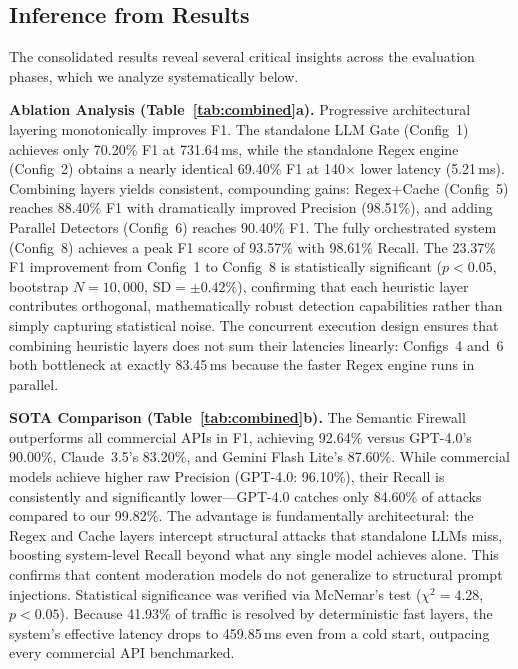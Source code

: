\documentclass[conference]{IEEEtran}
\begin{document}
\subsection{Inference from Results}

The consolidated results reveal several critical insights across
the evaluation phases, which we analyze systematically below.

\textbf{Ablation Analysis (Table~\ref{tab:combined}a).}
Progressive architectural layering monotonically improves F1. The
standalone LLM Gate (Config~1) achieves only 70.20\% F1 at
731.64\,ms, while the standalone Regex engine (Config~2) obtains a
nearly identical 69.40\% F1 at 140$\times$ lower latency (5.21\,ms).
Combining layers yields consistent, compounding gains: Regex+Cache
(Config~5) reaches 88.40\% F1 with dramatically improved Precision
(98.51\%), and adding Parallel Detectors (Config~6) reaches 90.40\%
F1. The fully orchestrated system (Config~8) achieves a peak F1 score of 93.57\% with
98.61\% Recall. The 23.37\% F1 improvement from Config~1 to Config~8
is statistically significant ($p < 0.05$, bootstrap $N{=}10{,}000$,
$\text{SD}=\pm 0.42\%$), confirming that each heuristic layer
contributes orthogonal, mathematically robust detection capabilities
rather than simply capturing statistical noise. The concurrent
execution design ensures that combining heuristic layers does not
sum their latencies linearly: Configs~4 and~6 both bottleneck at
exactly 83.45\,ms because the faster Regex engine runs in parallel.

\textbf{SOTA Comparison (Table~\ref{tab:combined}b).} The Semantic
Firewall outperforms all commercial APIs in F1, achieving 92.64\%
versus GPT-4.0's 90.00\%, Claude~3.5's 83.20\%, and Gemini
Flash Lite's 87.60\%. While commercial models achieve higher raw
Precision (GPT-4.0: 96.10\%), their Recall is consistently and
significantly lower---GPT-4.0 catches only 84.60\% of attacks
compared to our 99.82\%. The advantage is fundamentally
architectural: the Regex and Cache layers intercept structural
attacks that standalone LLMs miss, boosting system-level Recall
beyond what any single model achieves alone. This confirms that content moderation models do not generalize to
structural prompt injections. Statistical significance was verified
via McNemar's test ($\chi^2{=}4.28$, $p < 0.05$). Because 41.93\%
of traffic is resolved by deterministic fast layers, the system's
effective latency drops to 459.85\,ms even from a cold start,
outpacing every commercial API benchmarked.
\end{document}
